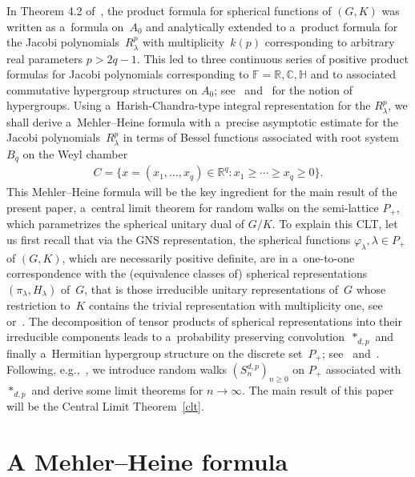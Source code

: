\documentclass[11pt]{article}
\numberwithin{equation}{section}
\begin{document}
In Theorem 4.2 of~\cite{RR}, the product formula for spherical functions of $(G,K)$ was written as a~formula on~$A_0$
and analytically extended to a~product formula for the Jacobi polyno\-mials~$R_\lambda^p$ with multiplicity~$k(p)$
corresponding to arbitrary real parameters $p>2q-1$.
This led to three continuous series of positive product formulas for Jacobi polynomials corresponding to $\mathbb
F=\mathbb R, \mathbb C, \mathbb H$ and to associated commutative hypergroup structures on $A_0$; see~\cite{J}
and~\cite{BH} for the notion of hypergroups.
Using a~Harish-Chandra-type integral representation for the $R_\lambda^p$, we shall derive a~Mehler--Heine formula with
a~precise asymptotic estimate for the Jacobi polyno\-mials~$R_{\lambda}^p$ in terms of Bessel functions associated with
root system $B_q$ on the Weyl chamber
\begin{gather*}
C=\{x= (x_1, \ldots, x_q) \in \mathbb R^q: x_1 \geq \cdots \geq x_q \geq 0\}.
\end{gather*}
This Mehler--Heine formula will be the key ingredient for the main result of the present paper, a~central limit theorem
for random walks on the semi-lattice $P_+$, which parametrizes the spherical unitary dual of $G/K$.
To explain this CLT, let us f\/irst recall that via the GNS representation, the spherical functions $\varphi_\lambda,
\lambda \in P_+$ of $(G,K)$, which are necessarily positive def\/inite, are in a~one-to-one correspondence with the
(equivalence classes of) spherical representations $(\pi_\lambda,H_\lambda)$ of~$G$, that is those irreducible unitary
representations of~$G$ whose restriction to~$K$ contains the trivial representation with multiplicity one, see~\cite{F}
or~\cite[Chapter~IV]{Hel}.
The decomposition of tensor products of spherical representations into their irreducible components leads to
a~probability preserving convolution~$*_{d,p}$ and f\/inally a~Hermitian hypergroup structure on the discrete set~$P_+$;
see~\cite{Du} and~\cite{K3}.
Following, e.g.,~\cite{BH,V1,Z}, we introduce random walks $(S_n^{d,p})_{n\ge0}$ on $P_+$ associated
with $*_{d,p}$ and derive some limit theorems for $n\to\infty$.
The main result of this paper will be the Central Limit Theorem~\ref{clt}.
\setcounter{section}{1}
\setcounter{subsection}{0}
\setcounter{subsubsection}{0}
\setcounter{Theorem}{1}
\setcounter{equation}{2}
\section{A Mehler--Heine formula}\label{Section2}
\end{document}
